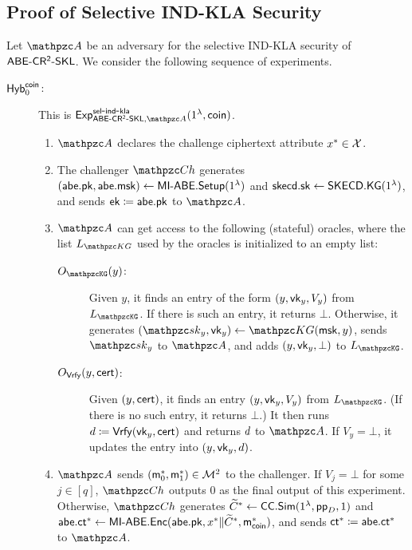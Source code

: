 \subsection{Proof of Selective IND-KLA Security}
Let $\qA$ be an adversary for the selective IND-KLA security of $\mathsf{ABE}\textrm{-}\mathsf{CR^2}\textrm{-}\mathsf{SKL}$.
We consider the following sequence of experiments.
\begin{description}
\item[$\mathsf{Hyb}_{0}^{\mathsf{coin}}$:] This is
$\expc{\ABECRCRSKL,\qA}{sel}{ind}{kla}(1^\secp,\coin)$.

\begin{enumerate}
\item $\qA$ declares the challenge ciphertext attribute $x^* \in \mathcal{X}$.
\item The challenger $\qCh$ generates
    $(\mathsf{abe}.\mathsf{pk},\mathsf{abe}.\mathsf{msk})\leftarrow\mathsf{MI}\textrm{-}\mathsf{ABE}.\mathsf{Setup}(1^\lambda)$ and
    $\mathsf{skecd}.\mathsf{sk} \leftarrow \mathsf{SKECD}.\mathsf{KG}(1^\lambda)$, and sends $\mathsf{ek}\coloneqq\mathsf{abe}.\mathsf{pk}$ to $\qA$.

\item $\qA$ can get access to the following (stateful) oracles, where
the list $L_{\qKG}$ used by the oracles is initialized to an empty
list:


\begin{description}
\item[$\Oracle{\qKG}(y)$:] Given $y$, it finds an entry of the form
$(y,\mathsf{vk}_y,V_y)$ from $\List{\qKG}$. If there is such an entry, it returns $\bot$.
Otherwise, it generates $(\qsk_y,\vk_y)\la\qKG(\msk,y)$,
sends $\qsk_y$ to $\qA$, and adds $(y,\mathsf{vk}_y,\bot)$ to $\List{\qKG}$.
    
\item[$O_{\mathtt{\mathsf{Vrfy}}}(y, \mathsf{cert})$:] Given $(y, \mathsf{cert})$, it finds an
entry $(y,\mathsf{vk}_y,V_y)$ from $\List{\qKG}$. (If there is no such entry, it returns $\bot$.) 
It then runs $d \coloneqq \mathsf{Vrfy}(\mathsf{vk}_y, \mathsf{cert})$ and returns
$d$ to $\qA$. If $V_y=\bot$, it updates the entry into
$(y,\mathsf{vk}_y,d)$.
\end{description}

\item $\qA$ sends $(\mathsf{m}_0^*,\mathsf{m}_1^*)\in \mathcal{M}^2$ to the challenger. If
$V_j=\bot$ for some $j\in[q]$, $\qCh$ outputs $0$ as the final
output of this experiment. Otherwise, $\qCh$ generates
$\widetilde{C}^*\leftarrow\mathsf{CC}.\mathsf{Sim}(1^\lambda, \mathsf{pp}_D, 1)$ and
$\mathsf{abe}.\mathsf{ct}^*\leftarrow\mathsf{MI}\textrm{-}\mathsf{ABE}.\mathsf{Enc}(\mathsf{abe}.\mathsf{pk},x^* \| \widetilde{C}^*,\mathsf{m}_{\mathsf{coin}}^*)$, and sends
$\mathsf{ct}^*\coloneqq\mathsf{abe}.\mathsf{ct}^*$ to $\qA$.


\end{enumerate}
\end{description}
